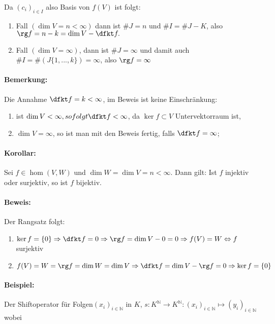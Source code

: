 	Da $(c_i)_{i\in I}$ also Basis von $f(V)$ ist folgt:
			
	\begin{enumerate}
				\item Fall $(\dim V = n<\infty)$ dann ist $\# J = n$ und $\# I = \# J-K$, also $\rg f = n-k = \dim V -\dfkt f.$\\
				\item Fall $(\dim V = \infty)$, dann ist $\# J = \infty $ und damit auch $\#I =\#(J\{{1,...,k\}})=\infty $, also $\rg f= \infty$
				
	\end{enumerate}
			
	\paragraph{Bemerkung: } Die Annahme $\dfkt f = k<\infty$, im Beweis ist keine Einschränkung:
	
	\begin{enumerate}
				\item ist $\dim V < \infty, so folgt \dfkt f<\infty$, da $\ker f\subset V$ Untervektorraum ist,				
				\item $\dim V = \infty$, so ist man mit den Beweis fertig, falls $\dfkt f = \infty$;
	\end{enumerate}
			
	\paragraph{Korollar: } 
	Sei $f\in \hom(V,W)$ und $\dim W = \dim V = n<\infty$. Dann gilt: Ist $f$ injektiv oder surjektiv, so ist $f$ bijektiv.
	
	\paragraph{Beweis: } 
		Der Rangsatz folgt:
		\begin{enumerate}
			\item $\ker f = \{{0\}} \Rightarrow \dfkt f = 0 \Rightarrow \rg f = \dim V-0 = 0 \Rightarrow f(V) = W \Leftrightarrow f$ surjektiv
			\item $f(V) = W = \rg f = \dim W = \dim V \Rightarrow \dfkt f= \dim V - \rg f=0 \Rightarrow \ker f = \{{0}\}$
		\end{enumerate}
	
	\paragraph{Beispiel: }
		Der Shiftoperator für Folgen$(x_i)_{i\in \mathbb{N}}$ in $K$, $s: K^{\mathbb{N}} \rightarrow K^{\mathbb{N}}: (x_i)_{i\in \mathbb{N}} \mapsto (y_i)_{i\in \mathbb{N}}$ wobei
		

